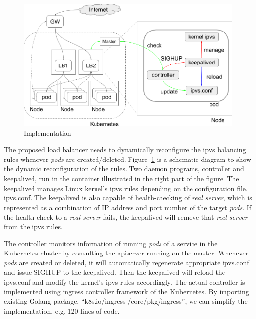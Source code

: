 \begin{figure}
\includegraphics[width=\columnwidth]{Figs/ipvs-ingress-schem}
\caption{Implementation}
\label{fig:ipvs-ingress-schem}
\end{figure}

The proposed load balancer needs to dynamically reconfigure the ipvs balancing rules whenever {\em pods} are created/deleted. 
Figure~\ref{fig:ipvs-ingress-schem} is a schematic diagram to show the dynamic reconfiguration of the rules.
Two daemon programs, controller and keepalived, run in the container illustrated in the right part of the figure.
The keepalived manages Linux kernel's ipvs rules depending on the configuration file, ipvs.conf.
The keepalived is also capable of health-checking of {\em real server}, 
which is represented as a combination of IP address and port number of the target {\em pods}. 
If the health-check to a {\em real server} fails, the keepalived will remove that {\em real server} from the ipvs rules.

The controller monitors information of running {\em pods} of a service in the Kubernetes cluster by consulting the apiserver running on the master.
Whenever {\em pods} are created or deleted, it will automatically regenerate appropriate ipvs.conf and issue SIGHUP to the keepalived.
Then the keepalived will reload the ipvs.conf and modify the kernel's ipvs rules accordingly.  
The actual controller\cite{ktaka_ccmp_2017_826894} is implemented using ingress controller\cite{K8sIngress2017} framework of the Kubernetes. 
By importing existing Golang package, \enquote{k8s.io/ingress /core/pkg/ingress}, we can simplify the implementation, e.g. 
120 lines of code.  


